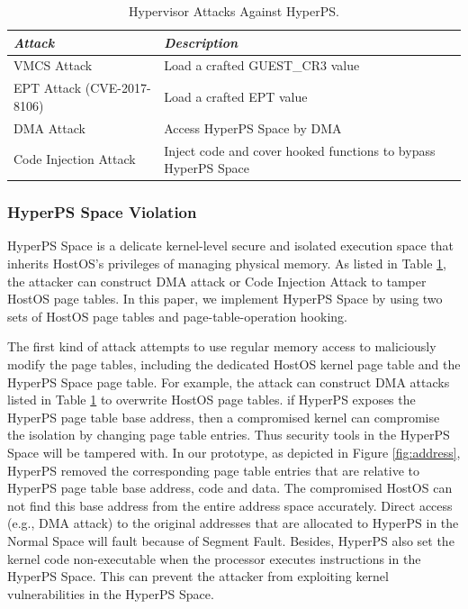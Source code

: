 \begin{table}
\centering
\caption{Hypervisor Attacks Against HyperPS.}\label{tab3}
\begin{tabular}{p{2.8cm}|p{5.5cm}}
\hline
{\itshape\bfseries Attack} & {\itshape\bfseries Description} \\
\hline
VMCS Attack & Load a crafted GUEST\_CR3 value\\
\hline
EPT Attack (CVE-2017-8106) & Load a crafted EPT value \\
\hline
DMA Attack & Access HyperPS Space by DMA \\
\hline
Code Injection Attack & Inject code and cover hooked functions to bypass HyperPS Space \\
\hline
\end{tabular}
\end{table}




\subsubsection{HyperPS Space Violation}%
\label{ssub:hyperps_space_violation}
HyperPS Space is a delicate kernel-level secure and isolated execution space that inherits HostOS's privileges of managing physical memory. As listed in Table \ref{tab3}, the attacker can construct DMA attack or Code Injection Attack to tamper HostOS page tables.  
In this paper, we implement HyperPS Space by using two sets of HostOS page tables and page-table-operation hooking.

The first kind of attack attempts to use regular memory access to maliciously modify the page tables, including the dedicated HostOS kernel page table and the HyperPS Space page table. 
For example, the attack can construct DMA attacks listed in Table \ref{tab3} to overwrite HostOS page tables.  
if HyperPS exposes the HyperPS page table base address, then a compromised kernel can compromise the isolation by changing page table entries. Thus security tools in the HyperPS Space will be tampered with. 
In our prototype, as depicted in Figure \ref{fig:address},
HyperPS removed the corresponding page table entries that are relative to HyperPS page table base address, code and data. 
The compromised HostOS can not find this base address from the entire address space accurately. 
Direct access (e.g., DMA attack) to the original addresses that are allocated to HyperPS in the Normal Space will fault because of Segment Fault.
Besides, HyperPS also set the kernel code non-executable when the processor executes instructions in the HyperPS Space. This can prevent the attacker from exploiting kernel vulnerabilities in the HyperPS Space.

